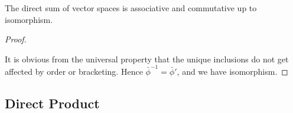 \begin{theorem}
    The direct sum of vector spaces is associative and commutative up to isomorphism.
\end{theorem}
\begin{proof}
    \begin{center}
    \end{center}
    It is obvious from the universal property that
    the unique inclusions do not get affected by order or bracketing.
    Hence \(\bar{\phi}^{-1} = \bar{\phi}'\),
    and we have isomorphism.
\end{proof}


\subsection*{Direct Product}

